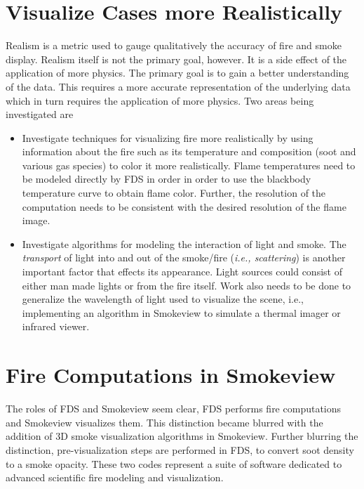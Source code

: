\documentclass[11pt,twoside]{book}
\begin{document}
\section{Visualize Cases more Realistically}
Realism is a metric used to gauge qualitatively the accuracy of
fire and smoke display. Realism itself is not the primary goal,
however.  It is a side effect of the application of more physics.
The primary goal is to gain a better understanding of the data.
This requires a more accurate representation of the underlying
data which in turn requires the application of more physics.  Two
areas being investigated are
\begin{itemize}
\item Investigate techniques for visualizing fire more
realistically by using information about the fire such as its
temperature and composition (soot and various gas species) to
color it more realistically.  Flame temperatures need to be
modeled directly by FDS in order in order to use the blackbody
temperature curve to obtain flame color.  Further, the resolution
of the computation needs to be consistent with the desired
resolution of the flame image.

\item Investigate algorithms for modeling the interaction of light
and smoke. The {\em transport} of light into and out of the
smoke/fire ({\em i.e., scattering}) is another important factor
that effects its appearance.  Light sources could consist of
either man made lights or from the fire itself.  Work also needs
to be done to generalize the wavelength of light used to visualize
the scene, i.e., implementing an algorithm in Smokeview to
simulate a thermal imager or infrared viewer.
\end{itemize}

%
%

\section{Fire Computations in Smokeview}
The roles of FDS and Smokeview seem clear, FDS performs fire
computations and Smokeview visualizes them. This distinction
became blurred with the addition of 3D smoke visualization
algorithms in Smokeview. Further blurring the distinction,
pre-visualization steps are performed in FDS, to convert soot
density to a smoke opacity. These two codes represent a suite of
software dedicated to advanced scientific fire modeling and
visualization.
\end{document}
